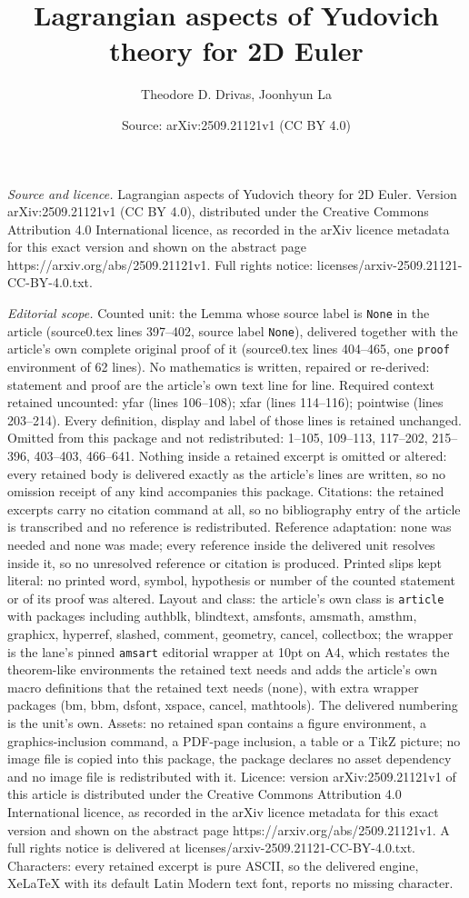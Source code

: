 \documentclass[10pt,a4paper]{amsart}
\title[Lagrangian aspects of Yudovich theory for 2D Euler]{Lagrangian aspects of Yudovich theory for 2D Euler}
\author{Theodore D. Drivas, Joonhyun La}
\date{Source: arXiv:2509.21121v1 (CC BY 4.0)}
\begin{document}
\maketitle

\noindent\emph{Source and licence.} Lagrangian aspects of Yudovich theory for 2D Euler. Version arXiv:2509.21121v1 (CC BY 4.0), distributed under the Creative Commons Attribution 4.0 International licence, as recorded in the arXiv licence metadata for this exact version and shown on the abstract page https://arxiv.org/abs/2509.21121v1. Full rights notice: licenses/arxiv-2509.21121-CC-BY-4.0.txt.\par\smallskip

\noindent\textit{Editorial scope.} Counted unit: the Lemma whose source label is \texttt{None} in the article (source0.tex lines 397--402, source label \texttt{None}), delivered together with the article's own complete original proof of it (source0.tex lines 404--465, one \texttt{proof} environment of 62 lines). No mathematics is written, repaired or re-derived: statement and proof are the article's own text line for line. Required context retained uncounted: yfar (lines 106--108); xfar (lines 114--116); pointwise (lines 203--214). Every definition, display and label of those lines is retained unchanged. Omitted from this package and not redistributed: 1--105, 109--113, 117--202, 215--396, 403--403, 466--641. Nothing inside a retained excerpt is omitted or altered: every retained body is delivered exactly as the article's lines are written, so no omission receipt of any kind accompanies this package. Citations: the retained excerpts carry no citation command at all, so no bibliography entry of the article is transcribed and no reference is redistributed. Reference adaptation: none was needed and none was made; every reference inside the delivered unit resolves inside it, so no unresolved reference or citation is produced. Printed slips kept literal: no printed word, symbol, hypothesis or number of the counted statement or of its proof was altered. Layout and class: the article's own class is \texttt{article} with packages including authblk, blindtext, amsfonts, amsmath, amsthm, graphicx, hyperref, slashed, comment, geometry, cancel, collectbox; the wrapper is the lane's pinned \texttt{amsart} editorial wrapper at 10pt on A4, which restates the theorem-like environments the retained text needs and adds the article's own macro definitions that the retained text needs (none), with extra wrapper packages (bm, bbm, dsfont, xspace, cancel, mathtools). The delivered numbering is the unit's own. Assets: no retained span contains a figure environment, a graphics-inclusion command, a PDF-page inclusion, a table or a TikZ picture; no image file is copied into this package, the package declares no asset dependency and no image file is redistributed with it. Licence: version arXiv:2509.21121v1 of this article is distributed under the Creative Commons Attribution 4.0 International licence, as recorded in the arXiv licence metadata for this exact version and shown on the abstract page https://arxiv.org/abs/2509.21121v1. A full rights notice is delivered at licenses/arxiv-2509.21121-CC-BY-4.0.txt. Characters: every retained excerpt is pure ASCII, so the delivered engine, XeLaTeX with its default Latin Modern text font, reports no missing character.
\end{document}
